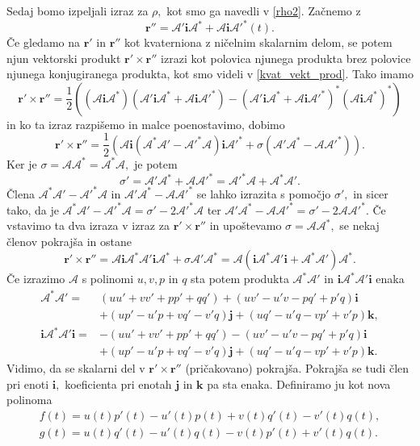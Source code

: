 \documentclass[12pt,a4paper,twoside]{article}
\theoremstyle{definition} %
\theoremstyle{plain} %
\theoremstyle{primerstyle}
\numberwithin{equation}{section}  %
\newcommand{\rV}{\mathbf{r}}
\newcommand{\iV}{\mathbf{i}}
\newcommand{\jV}{\mathbf{j}}
\newcommand{\kV}{\mathbf{k}}
\newcommand{\AQ}{\mathcal{A}}
\begin{document}
Sedaj bomo izpeljali izraz za $\rho,$ kot smo ga navedli v \eqref{rho2}. Začnemo z $$\rV''=\AQ'\iV\AQ^*+\AQ\iV\AQ'^*(t).$$ Če gledamo na $\rV'$ in $\rV''$ kot kvaterniona z ničelnim skalarnim delom, se potem njun vektorski produkt $\rV'\times\rV''$ izrazi kot polovica njunega produkta brez polovice njunega konjugiranega produkta, kot smo videli v \eqref{kvat_vekt_prod}. Tako imamo
\begin{equation*}
	\rV'\times\rV''=\frac{1}{2}\left ( (\AQ\iV\AQ^*)(\AQ'\iV\AQ^*+\AQ\iV\AQ'^*)-(\AQ'\iV\AQ^*+\AQ\iV\AQ'^*)^*(\AQ\iV\AQ^*)^* \right )
\end{equation*}
in ko ta izraz razpišemo in malce poenostavimo, dobimo
\begin{equation*}
	\rV'\times\rV''=\frac{1}{2}\left ( \AQ\iV(\AQ^*\AQ'-\AQ'^*\AQ)\iV\AQ'^*+\sigma(\AQ'\AQ^*-\AQ\AQ'^*) \right ).
\end{equation*}
Ker je $\sigma=\AQ\AQ^*=\AQ^*\AQ,$ je potem
\begin{equation*}
	\sigma'=\AQ'\AQ^*+\AQ\AQ'^*=\AQ'^*\AQ+\AQ^*\AQ'.
\end{equation*}
Člena $\AQ^*\AQ'-\AQ'^*\AQ$ in $\AQ'\AQ^*-\AQ\AQ'^*$ se lahko izrazita s pomočjo $\sigma',$ in sicer tako, da je $\AQ^*\AQ'-\AQ'^*\AQ=\sigma'-2\AQ'^*\AQ$ ter $\AQ'\AQ^*-\AQ\AQ'^*=\sigma'-2\AQ\AQ'^*.$ Če vstavimo ta dva izraza v izraz za $\rV'\times\rV''$ in upoštevamo $\sigma=\AQ\AQ^*,$ se nekaj členov pokrajša in ostane
\begin{equation*}
	\rV'\times\rV''=\AQ\iV\AQ^*\AQ'\iV\AQ^* + \sigma\AQ'\AQ^*=\AQ(\iV\AQ^*\AQ'\iV + \AQ^*\AQ')\AQ^*.
\end{equation*}
Če izrazimo $\AQ$ s polinomi $u,v,p$ in $q$ sta potem produkta $\AQ^*\AQ'$ in $\iV\AQ^*\AQ'\iV$ enaka
\begin{align*}
	\AQ^*\AQ'=&(uu'+vv'+pp'+qq')+(uv'-u'v-pq'+p'q)\iV \\
	&+(up'-u'p+vq'-v'q)\jV+(uq'-u'q-vp'+v'p)\kV, \\
	\iV\AQ^*\AQ'\iV=&-(uu'+vv'+pp'+qq')-(uv'-u'v-pq'+p'q)\iV \\
	&+(up'-u'p+vq'-v'q)\jV+(uq'-u'q-vp'+v'p)\kV.
\end{align*}
Vidimo, da se skalarni del v $\rV'\times\rV''$ (pričakovano) pokrajša. Pokrajša se tudi člen pri enoti $\iV,$ koeficienta pri enotah $\jV$ in $\kV$ pa sta enaka. Definiramo ju kot nova polinoma
\begin{align}
	f(t)=u(t)p'(t)-u'(t)p(t)+v(t)q'(t)-v'(t)q(t), \nonumber \\
	g(t)=u(t)q'(t)-u'(t)q(t)-v(t)p'(t)+v'(t)q(t). \label{polinoma_f_g}
\end{align}
\end{document}
